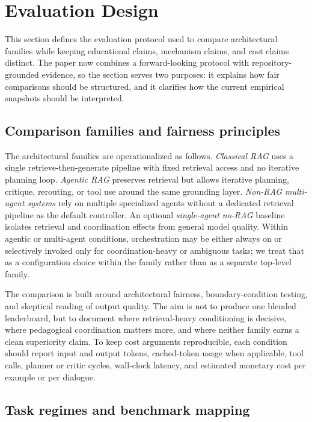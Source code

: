 \section{Evaluation Design}

This section defines the evaluation protocol used to compare architectural families while keeping educational claims, mechanism claims, and cost claims distinct. The paper now combines a forward-looking protocol with repository-grounded evidence, so the section serves two purposes: it explains how fair comparisons should be structured, and it clarifies how the current empirical snapshots should be interpreted.

\subsection{Comparison families and fairness principles}

The architectural families are operationalized as follows. \emph{Classical RAG} uses a single retrieve-then-generate pipeline with fixed retrieval access and no iterative planning loop. \emph{Agentic RAG} preserves retrieval but allows iterative planning, critique, rerouting, or tool use around the same grounding layer. \emph{Non-RAG multi-agent systems} rely on multiple specialized agents without a dedicated retrieval pipeline as the default controller. An optional \emph{single-agent no-RAG} baseline isolates retrieval and coordination effects from general model quality. Within agentic or multi-agent conditions, orchestration may be either always on or selectively invoked only for coordination-heavy or ambiguous tasks; we treat that as a configuration choice within the family rather than as a separate top-level family.

The comparison is built around architectural fairness, boundary-condition testing, and skeptical reading of output quality. The aim is not to produce one blended leaderboard, but to document where retrieval-heavy conditioning is decisive, where pedagogical coordination matters more, and where neither family earns a clean superiority claim. To keep cost arguments reproducible, each condition should report input and output tokens, cached-token usage when applicable, tool calls, planner or critic cycles, wall-clock latency, and estimated monetary cost per example or per dialogue.

\subsection{Task regimes and benchmark mapping}

